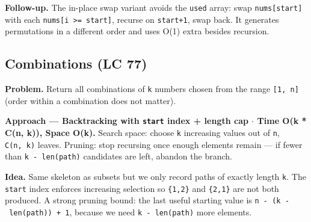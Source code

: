 \documentclass[11pt]{article}
\begin{document}
\textbf{Follow-up.} The in-place swap variant avoids the \texttt{used} array: swap \texttt{nums{[}start{]}} with each \texttt{nums{[}i\ \textgreater{}=\ start{]}}, recurse on \texttt{start+1}, swap back. It generates permutations in a different order and uses O(1) extra besides recursion.

\subsection{Combinations (LC 77)}\label{combinations-lc-77}

\textbf{Problem.} Return all combinations of \texttt{k} numbers chosen from the range \texttt{{[}1,\ n{]}} (order within a combination does not matter).

\textbf{Approach --- Backtracking with \texttt{start} index + length cap \(\cdot\) Time O(k * C(n, k)), Space O(k).} Search space: choose \texttt{k} increasing values out of \texttt{n}, \texttt{C(n,\ k)} leaves. Pruning: stop recursing once enough elements remain --- if fewer than \texttt{k\ -\ len(path)} candidates are left, abandon the branch.

\textbf{Idea.} Same skeleton as subsets but we only record paths of exactly length \texttt{k}. The \texttt{start} index enforces increasing selection so \texttt{\{1,2\}} and \texttt{\{2,1\}} are not both produced. A strong pruning bound: the last useful starting value is \texttt{n\ -\ (k\ -\ len(path))\ +\ 1}, because we need \texttt{k\ -\ len(path)} more elements.

\end{document}
